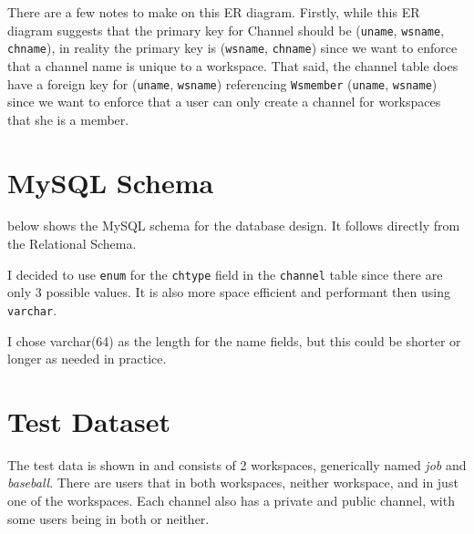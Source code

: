 \documentclass{article}
\newcommand{\ze}{she\xspace}
\begin{document}
There are a few notes to make on this ER diagram. Firstly, while this ER diagram suggests that the primary key for Channel should be (\texttt{uname}, \texttt{wsname}, \texttt{chname}), in reality the primary key is (\texttt{wsname}, \texttt{chname}) since we want to enforce that a channel name is unique to a workspace. That said, the channel table does have a foreign key for (\texttt{uname}, \texttt{wsname}) referencing \texttt{Wsmember} (\texttt{uname}, \texttt{wsname}) since we want to enforce that a user can only create a channel for workspaces that \ze is a member.

\section{MySQL Schema}

 below shows the MySQL schema for the database design. It follows directly from the Relational Schema.



I decided to use \texttt{enum} for the \texttt{chtype} field in the \texttt{channel} table since there are only 3 possible values. It is also more space efficient and performant then using \texttt{varchar}.

I chose varchar(64) as the length for the name fields, but this could be shorter or longer as needed in practice.


\section{Test Dataset}

The test data is shown in  and consists of 2 workspaces, generically named \textit{job} and \textit{baseball}. There are users that in both workspaces, neither workspace, and in just one of the workspaces. Each channel also has a private and public channel, with some users being in both or neither.
\end{document}
